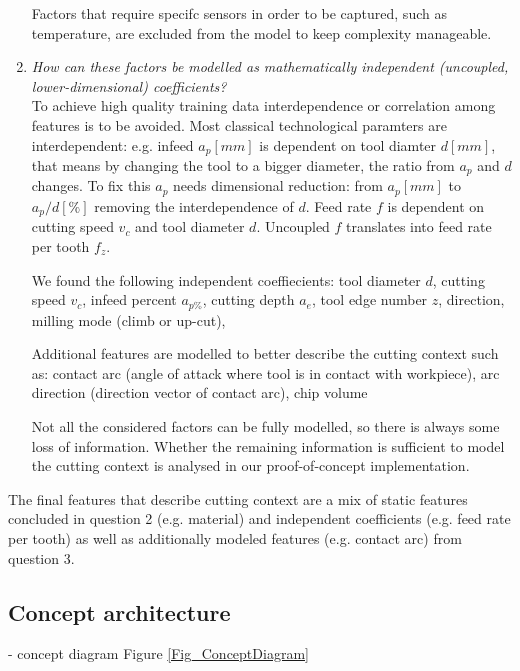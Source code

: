 \documentclass[5p,times,procedia]{elsarticle}
\begin{document}
\begin{enumerate}
	Factors that require specifc sensors in order to be captured, such as temperature, are excluded from the model to keep complexity manageable.
	
	\vspace*{.5\baselineskip}
	\item\label{Q3} \textit{How can these factors be modelled as mathematically independent (uncoupled, lower-dimensional) coefficients?}\\
	To achieve high quality training data interdependence or correlation among features is to be avoided.
	Most classical technological paramters are interdependent: e.g. infeed $a_p [mm]$ is dependent on tool diamter $d [mm]$, that means by changing the tool to a bigger diameter, the ratio from $a_p$ and $d$ changes. To fix this $a_p$ needs dimensional reduction: from $a_p [mm]$ to $a_p / d [\%]$ removing the interdependence of $d$. Feed rate $f$ is dependent on cutting speed $v_c$ and tool diameter $d$. Uncoupled $f$ translates into feed rate per tooth $f_z$.
	
	We found the following independent coeffiecients:
	tool diameter $d$, cutting speed $v_c$, infeed percent $a_{p\%}$, cutting depth $a_e$, tool edge number $z$, direction, milling mode (climb or up-cut), 
	
	Additional features are modelled to better describe the cutting context such as: contact arc (angle of attack where tool is in contact with workpiece), arc direction (direction vector of contact arc), chip volume
	
	Not all the considered factors can be fully modelled, so there is always some loss of information.
	Whether the remaining information is sufficient to model the cutting context is analysed in our proof-of-concept implementation.
\end{enumerate}

The final features that describe cutting context are a mix of static features concluded in question 2 (e.g. material) and independent coefficients (e.g. feed rate per tooth) as well as additionally modeled features (e.g. contact arc) from question 3.





\subsection{Concept architecture}
\vspace*{-\baselineskip}
- concept diagram Figure \ref{Fig_ConceptDiagram}
\end{document}
